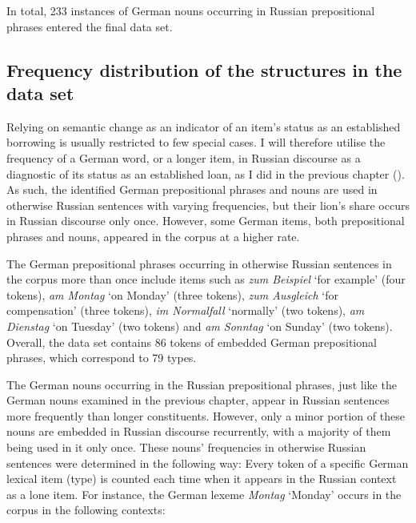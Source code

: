 In total, 233 instances of German nouns occurring in Russian prepositional phrases entered the final data set.

\subsection{Frequency distribution of the structures in the data set}

\noindent Relying on semantic change as an indicator of an item's status as an established borrowing is usually restricted to few special cases. I will therefore utilise the frequency of a German word, or a longer item, in Russian discourse as a diagnostic of its status as an established loan, as I did in the previous chapter (). As such, the identified German prepositional phrases and nouns are used in otherwise Russian sentences with varying frequencies, but their lion's share occurs in Russian discourse only once. However, some German items, both prepositional phrases and nouns, appeared in the corpus at a higher rate.

The German prepositional phrases occurring in otherwise Russian sentences in the corpus more than once include items such as \textit{zum Beispiel} `for example' (four tokens), \textit{am Montag} `on Monday' (three tokens),  \textit{zum Ausgleich} `for compensation' (three tokens), \textit{im Normalfall} `normally' (two tokens), \textit{am Dienstag} `on Tuesday' (two tokens) and \textit{am Sonntag} `on Sunday' (two tokens). Overall, the data set contains 86 tokens of embedded German prepositional phrases, which correspond to 79 types.

The German nouns occurring in the Russian prepositional phrases, just like the German nouns examined in the previous chapter, appear in Russian sentences more frequently than longer constituents. However, only a minor portion of these nouns are embedded in Russian discourse recurrently, with a majority of them being used in it only once. These nouns’ frequencies in otherwise Russian sentences were determined in the following way: Every token of a specific German lexical item (type) is counted each time when it appears in the Russian context as a lone item. For instance, the German lexeme \textit{Montag} `Monday' occurs in the corpus in the following contexts:


